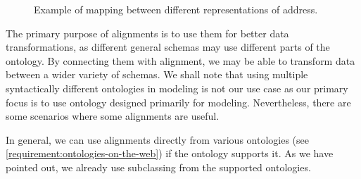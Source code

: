 \begin{figure}[h!]\centering
  \centering

  \caption{Example of mapping between different representations of address.}
\end{figure}

\medskip

The primary purpose of alignments is to use them for better data transformations, as different general schemas may use different parts of the ontology. By connecting them with alignment, we may be able to transform data between a wider variety of schemas. We shall note that using multiple syntactically different ontologies in modeling is not our use case as our primary focus is to use ontology designed primarily for modeling. Nevertheless, there are some scenarios where some alignments are useful.

In general, we can use alignments directly from various ontologies (see \autoref{requirement:ontologies-on-the-web}) if the ontology supports it. As we have pointed out, we already use subclassing from the supported ontologies.

